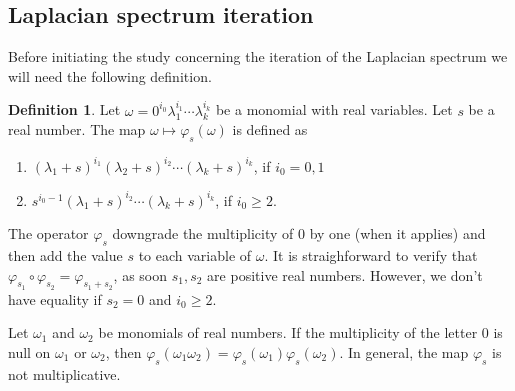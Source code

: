 \documentclass[11pt]{article}
\theoremstyle{definition}
\newtheorem{definition}[theorem]{Definition}
\begin{document}
 \subsection{Laplacian spectrum iteration}
Before initiating the study concerning the iteration of the Laplacian spectrum we will need the following definition.
\begin{definition}\label{desplazamiento monomial}
Let $\omega=0^{i_0}\lambda^{i_1}_1\cdots \lambda^{i_k}_{k}$ be a monomial with real variables. Let $s$ be a real number. The map $\omega \mapsto \varphi_s(\omega)$ is defined as
\begin{enumerate}
\item $(\lambda_1+s)^{i_1}(\lambda_2+s)^{i_2}\cdots (\lambda_k+s)^{i_k}$, if $i_0=0, 1$
\item $s^{i_0-1}(\lambda_1+s)^{i_2}\cdots (\lambda_k+s)^{i_k}$, if $i_0\geq 2$.
\end{enumerate}
\end{definition}
The operator $\varphi_s$ downgrade the multiplicity of $0$ by one (when it applies) and then add the value $s$ to each variable of $\omega$. It is straighforward to verify that $\varphi_{s_1}\circ \varphi_{s_2}=\varphi_{s_1+s_2}$, as soon $s_1, s_2$ are positive real numbers. However, we don't have equality if $s_2=0$ and $i_0\geq 2$.

Let  $\omega_1$ and $\omega_2$ be monomials of real numbers. If the multiplicity of the letter $0$ is null on $\omega_1$ or $\omega_2$, then
$\varphi_s(\omega_1\omega_2)=\varphi_s(\omega_1)\varphi_s(\omega_2)$. In general, the map $\varphi_s$ is not multiplicative.
\end{document}

